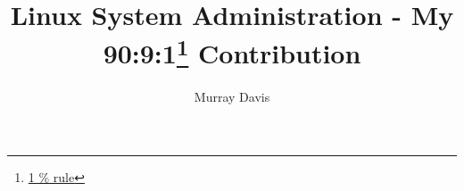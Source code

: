 \documentclass[twoside,letterpaper,11pt]{book}
\begin{document}

\pagestyle{empty}

\title{Linux System Administration - My 90:9:\textbf{\color{red}1}\footnote{\href{https://en.wikipedia.org/wiki/1\%25_rule_(Internet_culture)}{1 \% rule}} Contribution\newline}




\author{Murray Davis}
\date{}
\maketitle

\pagestyle{plain}
% 
%
%
%
%
\setcounter{secnumdepth}{4} %
\setcounter{tocdepth}{4}    %

\tableofcontents



















\listoftodos
\listoffigures
\listoftables
\printindex
\end{document}

